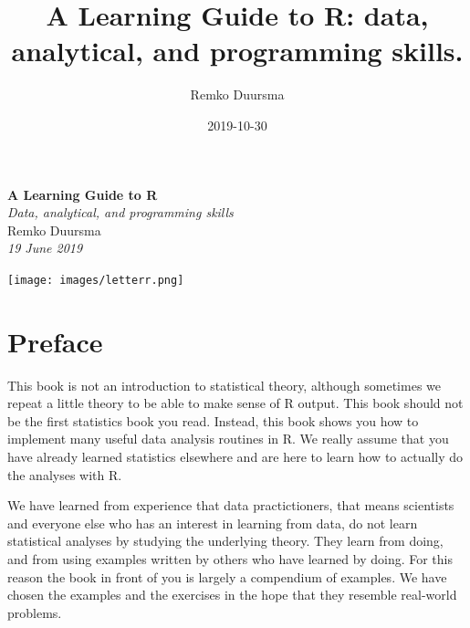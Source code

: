 \documentclass[]{book}
\title{A Learning Guide to R: data, analytical, and programming skills.}
\author{Remko Duursma}
\date{2019-10-30}
\let\oldmaketitle\maketitle
\begin{document}
\maketitle

\thispagestyle{empty}
\begin{center}

{ \Huge \textbf{A Learning Guide to R}}\\[0.4cm]
{ \large \textit{Data, analytical, and programming skills}} \\



\bigskip
\large{Remko Duursma}\\
\emph{19 June 2019}
\vfill

\texttt{[image: images/letterr.png]}\\[1cm]

\end{center}


\let\maketitle\oldmaketitle
\maketitle

{
\setcounter{tocdepth}{1}
\tableofcontents
}
\hypertarget{preface}{%
\chapter{Preface}\label{preface}}

This book is not an introduction to statistical theory, although sometimes we repeat a little theory to be able to make sense of R output. This book should not be the first statistics book you read. Instead, this book shows you how to implement many useful data analysis routines in R. We really assume that you have already learned statistics elsewhere and are here to learn how to actually do the analyses with R.

We have learned from experience that data practictioners, that means scientists and everyone else who has an interest in learning from data, do not learn statistical analyses by studying the underlying theory. They learn from doing, and from using examples written by others who have learned by doing. For this reason the book in front of you is largely a compendium of examples. We have chosen the examples and the exercises in the hope that they resemble real-world problems.
\end{document}
